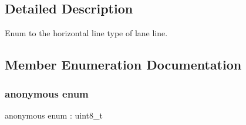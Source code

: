 \subsection{Detailed Description}
Enum to the horizontal line type of lane line. 

\subsection{Member Enumeration Documentation}
\mbox{\label{structmaf__perception__interface_1_1LaneHorizontalTypeEnum_a788fa6b923d6400f931ecfc49cbb1ecd}} 
\subsubsection{\texorpdfstring{anonymous enum}{anonymous enum}}
{\footnotesize\ttfamily anonymous enum \+: uint8\+\_\+t}

